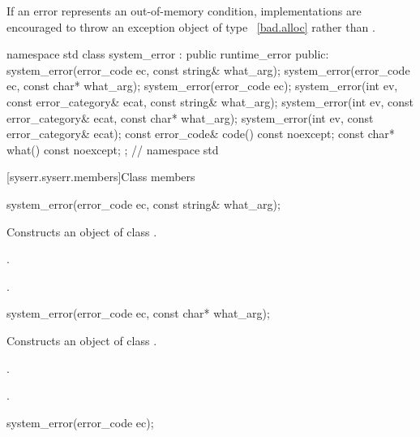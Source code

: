 \pnum
\begin{note} If an error represents an out-of-memory condition, implementations are
encouraged to throw an exception object of type ~\ref{bad.alloc} rather
than . \end{note}

%
\begin{codeblock}
namespace std {
  class system_error : public runtime_error {
  public:
    system_error(error_code ec, const string& what_arg);
    system_error(error_code ec, const char* what_arg);
    system_error(error_code ec);
    system_error(int ev, const error_category& ecat,
        const string& what_arg);
    system_error(int ev, const error_category& ecat,
        const char* what_arg);
    system_error(int ev, const error_category& ecat);
    const error_code& code() const noexcept;
    const char* what() const noexcept;
  };
}   // namespace std
\end{codeblock}

[syserr.syserr.members]{Class  members}

\begin{itemdecl}
system_error(error_code ec, const string& what_arg);
\end{itemdecl}

\begin{itemdescr}
\pnum
\effects Constructs an object of class .

\pnum
\postconditions {}.

.
\end{itemdescr}

\begin{itemdecl}
system_error(error_code ec, const char* what_arg);
\end{itemdecl}

\begin{itemdescr}
\pnum
\effects Constructs an object of class .

\pnum
\postconditions {}.

.
\end{itemdescr}

\begin{itemdecl}
system_error(error_code ec);
\end{itemdecl}

